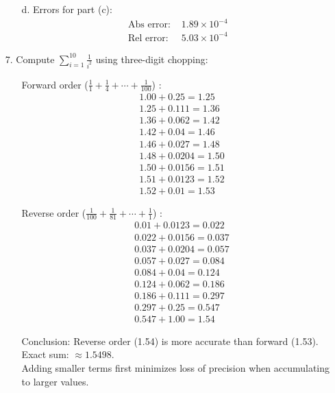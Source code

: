 \begin{enumerate}
\begin{itemize}
        \item[d.] Errors for part (c):
          \[
            \begin{aligned}
              \text{Abs error: } & \boxed{1.89 \times 10^{-4}} \\
              \text{Rel error: } & \boxed{5.03 \times 10^{-4}}
            \end{aligned}
          \]
      \end{itemize}

    \item[7.] Compute \( \sum_{i=1}^{10} \frac{1}{i^2} \) using
      three-digit chopping:
      \begin{itemize}
        \item[Forward order (\( \frac{1}{1} + \frac{1}{4} + \cdots +
          \frac{1}{100} \))]:
          \[
            \begin{aligned}
              &1.00 + 0.25 = 1.25 \\
              &1.25 + 0.111 = 1.36 \\
              &1.36 + 0.062 = 1.42 \\
              &1.42 + 0.04 = 1.46 \\
              &1.46 + 0.027 = 1.48 \\
              &1.48 + 0.0204 = 1.50 \\
              &1.50 + 0.0156 = 1.51 \\
              &1.51 + 0.0123 = 1.52 \\
              &1.52 + 0.01 = \boxed{1.53}
            \end{aligned}
          \]

        \item[Reverse order (\( \frac{1}{100} + \frac{1}{81} + \cdots
          + \frac{1}{1} \))]:
          \[
            \begin{aligned}
              &0.01 + 0.0123 = 0.022 \\
              &0.022 + 0.0156 = 0.037 \\
              &0.037 + 0.0204 = 0.057 \\
              &0.057 + 0.027 = 0.084 \\
              &0.084 + 0.04 = 0.124 \\
              &0.124 + 0.062 = 0.186 \\
              &0.186 + 0.111 = 0.297 \\
              &0.297 + 0.25 = 0.547 \\
              &0.547 + 1.00 = \boxed{1.54}
            \end{aligned}
          \]

        \item[Conclusion:] Reverse order (1.54) is more accurate than
          forward (1.53). \\
          Exact sum: \( \approx 1.5498 \). \\
          Adding smaller terms first minimizes loss of precision when
          accumulating to larger values.
      \end{itemize}
  \end{enumerate}

